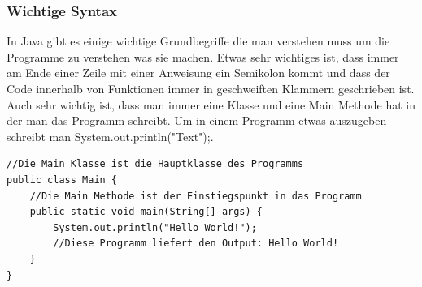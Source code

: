 \subsubsection{Wichtige Syntax}
In Java gibt es einige wichtige Grundbegriffe die man verstehen muss um die Programme zu verstehen was sie machen. Etwas sehr wichtiges ist, dass immer am Ende einer Zeile mit einer Anweisung ein Semikolon kommt und dass der Code innerhalb von Funktionen immer in geschweiften Klammern geschrieben ist. Auch sehr wichtig ist, dass man immer eine Klasse und eine Main Methode hat in der man das Programm schreibt. Um in einem Programm etwas auszugeben schreibt man System.out.println("Text");\cite{programmieren_lernen_java_2021}.
\begin{verbatim}
//Die Main Klasse ist die Hauptklasse des Programms
public class Main {
    //Die Main Methode ist der Einstiegspunkt in das Programm
    public static void main(String[] args) {
        System.out.println("Hello World!");
        //Diese Programm liefert den Output: Hello World!
    }
}
\end{verbatim}

